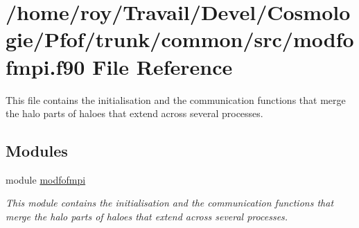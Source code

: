 \hypertarget{modfofmpi_8f90}{}\section{/home/roy/\+Travail/\+Devel/\+Cosmologie/\+Pfof/trunk/common/src/modfofmpi.f90 File Reference}
\label{modfofmpi_8f90}


This file contains the initialisation and the communication functions that merge the halo parts of haloes that extend across several processes.  


\subsection*{Modules}
\begin{DoxyCompactItemize}
\item 
module \hyperlink{namespacemodfofmpi}{modfofmpi}
\begin{DoxyCompactList}\small\item\em This module contains the initialisation and the communication functions that merge the halo parts of haloes that extend across several processes. \end{DoxyCompactList}\end{DoxyCompactItemize}
